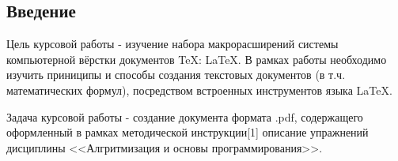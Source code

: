 \setcounter{page}{3}
\setlength{\parskip}{5pt}
\setlength{\parindent}{1,25cm}
\linespread{1.3}
\pagestyle{plain}
\fontsize{14pt}{16.8pt}\selectfont

\newpage
\begin{center}
\section*{Введение}
\label{sec:intro}
\end{center}
\par
\fontsize{14pt}{16.8pt}\selectfont
Цель курсовой работы - изучение набора макрорасширений системы компьютерной вёрстки документов TeX: LaTeX. В рамках работы необходимо изучить приниципы и способы создания текстовых документов (в т.ч. математических формул), посредством встроенных инструментов языка LaTeX.
\par
\fontsize{14pt}{16.8pt}\selectfont
Задача курсовой работы - создание документа формата .pdf, содержащего оформленный в рамках методической инструкции[1] описание упражнений дисциплины <<Алгритмизация и основы программирования>>.

